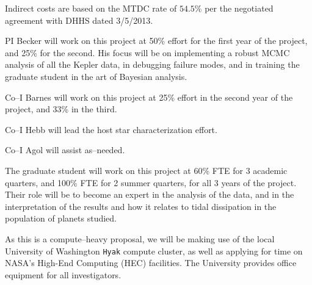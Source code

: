 Indirect costs are based on the MTDC rate of $54.5\%$ per the
negotiated agreement with DHHS dated 3/5/2013.

\pagebreak

\bigskip {}

PI Becker will work on this project at 50\% effort for the first
year of the project, and 25\% for the second.  His focus will be on
implementing a robust MCMC analysis of all the Kepler data, in
debugging failure modes, and in training the graduate student in the
art of Bayesian analysis.

Co--I Barnes will work on this project at 25\% effort in the second
year of the project, and 33\% in the third.

Co--I Hebb will lead the host star characterization effort.

Co--I Agol will assist as--needed.

The graduate student will work on this project at 60\% FTE for 3
academic quarters, and 100\% FTE for 2 summer quarters, for all 3
years of the project. Their role will be to become an expert in the
analysis of the data, and in the interpretation of the results and how
it relates to tidal dissipation in the population of planets studied.

\bigskip {}

As this is a compute--heavy proposal, we will be making use of the
local University of Washington {\tt Hyak} compute cluster, as well as
applying for time on NASA's High-End Computing (HEC) facilities.  The
University provides office equipment for all investigators.

